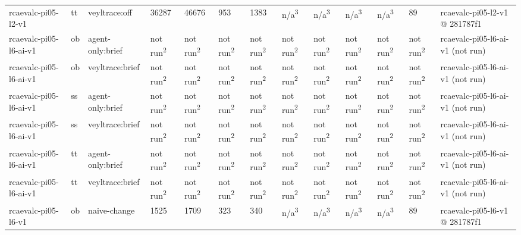 \begin{table}[t]
\begin{tabular}{lllllllllllll}
rcaevalc-pi05-l2-v1 & tt & veyltrace:off & 36287 & 46676 & 953 & 1383 & n/a\textsuperscript{3} & n/a\textsuperscript{3} & n/a\textsuperscript{3} & n/a\textsuperscript{3} & 89 & rcaevalc-pi05-l2-v1 @ 281787f1 \\
rcaevalc-pi05-l6-ai-v1 & ob & agent-only:brief & not run\textsuperscript{2} & not run\textsuperscript{2} & not run\textsuperscript{2} & not run\textsuperscript{2} & not run\textsuperscript{2} & not run\textsuperscript{2} & not run\textsuperscript{2} & not run\textsuperscript{2} & not run\textsuperscript{2} & rcaevalc-pi05-l6-ai-v1 (not run) \\
rcaevalc-pi05-l6-ai-v1 & ob & veyltrace:brief & not run\textsuperscript{2} & not run\textsuperscript{2} & not run\textsuperscript{2} & not run\textsuperscript{2} & not run\textsuperscript{2} & not run\textsuperscript{2} & not run\textsuperscript{2} & not run\textsuperscript{2} & not run\textsuperscript{2} & rcaevalc-pi05-l6-ai-v1 (not run) \\
rcaevalc-pi05-l6-ai-v1 & ss & agent-only:brief & not run\textsuperscript{2} & not run\textsuperscript{2} & not run\textsuperscript{2} & not run\textsuperscript{2} & not run\textsuperscript{2} & not run\textsuperscript{2} & not run\textsuperscript{2} & not run\textsuperscript{2} & not run\textsuperscript{2} & rcaevalc-pi05-l6-ai-v1 (not run) \\
rcaevalc-pi05-l6-ai-v1 & ss & veyltrace:brief & not run\textsuperscript{2} & not run\textsuperscript{2} & not run\textsuperscript{2} & not run\textsuperscript{2} & not run\textsuperscript{2} & not run\textsuperscript{2} & not run\textsuperscript{2} & not run\textsuperscript{2} & not run\textsuperscript{2} & rcaevalc-pi05-l6-ai-v1 (not run) \\
rcaevalc-pi05-l6-ai-v1 & tt & agent-only:brief & not run\textsuperscript{2} & not run\textsuperscript{2} & not run\textsuperscript{2} & not run\textsuperscript{2} & not run\textsuperscript{2} & not run\textsuperscript{2} & not run\textsuperscript{2} & not run\textsuperscript{2} & not run\textsuperscript{2} & rcaevalc-pi05-l6-ai-v1 (not run) \\
rcaevalc-pi05-l6-ai-v1 & tt & veyltrace:brief & not run\textsuperscript{2} & not run\textsuperscript{2} & not run\textsuperscript{2} & not run\textsuperscript{2} & not run\textsuperscript{2} & not run\textsuperscript{2} & not run\textsuperscript{2} & not run\textsuperscript{2} & not run\textsuperscript{2} & rcaevalc-pi05-l6-ai-v1 (not run) \\
rcaevalc-pi05-l6-v1 & ob & naive-change & 1525 & 1709 & 323 & 340 & n/a\textsuperscript{3} & n/a\textsuperscript{3} & n/a\textsuperscript{3} & n/a\textsuperscript{3} & 89 & rcaevalc-pi05-l6-v1 @ 281787f1 \\

\end{tabular}
\end{table}
